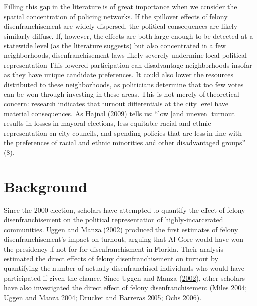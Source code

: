 \documentclass[12pt,]{article}
\begin{document}
Filling this gap in the literature is of great importance when we consider the spatial concentration of policing networks. If the spillover effects of felony disenfranchisement are widely dispersed, the political consequences are likely similarly diffuse. If, however, the effects are both large enough to be detected at a statewide level (as the literature suggests) but also concentrated in a few neighborhoods, disenfranchisement laws likely severely undermine local political representation This lowered participation can disadvantage neighborhoods insofar as they have unique candidate preferences. It could also lower the resources distributed to these neighborhoods, as politicians determine that too few votes can be won through investing in these areas. This is not merely of theoretical concern: research indicates that turnout differentials at the city level have material consequences. As Hajnal (\protect\hyperlink{ref-Hajnal2009}{2009}) tells us: ``low {[}and uneven{]} turnout results in losses in mayoral elections, less equitable racial and ethnic representation on city councils, and spending policies that are less in line with the preferences of racial and ethnic minorities and other disadvantaged groups'' (8).

\hypertarget{background}{%
\section*{Background}\label{background}}

Since the 2000 election, scholars have attempted to quantify the effect of felony disenfranchisement on the political representation of highly-incarcerated communities. Uggen and Manza (\protect\hyperlink{ref-Uggen2002}{2002}) produced the first estimates of felony disenfranchisement's impact on turnout, arguing that Al Gore would have won the presidency if not for for disenfranchisment in Florida. Their analysis estimated the direct effects of felony disenfranchisement on turnout by quantifying the number of actually disenfranchised individuals who would have participated if given the chance. Since Uggen and Manza (\protect\hyperlink{ref-Uggen2002}{2002}), other scholars have also investigated the direct effect of felony disenfranchisement (Miles \protect\hyperlink{ref-Miles2004}{2004}; Uggen and Manza \protect\hyperlink{ref-Uggen2004}{2004}; Drucker and Barreras \protect\hyperlink{ref-Drucker2005}{2005}; Ochs \protect\hyperlink{ref-Ochs2006}{2006}).
\end{document}
